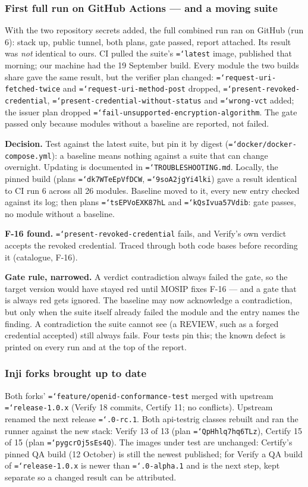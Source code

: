 \documentclass[11pt,a4paper]{article}
\let\origtexttt\texttt
\renewcommand{\texttt}[1]{\origtexttt{\hyphenchar\font=`\-\relax #1}}
\renewcommand{\_}{\textunderscore\allowbreak}
\begin{document}
\subsubsection*{First full run on GitHub Actions --- and a moving suite}
With the two repository secrets added, the full combined run ran on GitHub (run 6): stack up,
public tunnel, both plans, gate passed, report attached. Its result was \emph{not} identical to
ours. CI pulled the suite's \texttt{latest} image, published that morning; our machine had the
19 September build. Every module the two builds share gave the same result, but the verifier
plan changed: \texttt{request-uri-fetched-twice} and \texttt{request-uri-method-post} dropped,
\texttt{present-revoked-credential}, \texttt{present-credential-without-status} and
\texttt{wrong-vct} added; the issuer plan dropped \texttt{fail-unsupported-encryption-algorithm}.
The gate passed only because modules without a baseline are reported, not failed.

\textbf{Decision.} Test against the latest suite, but pin it by digest
(\texttt{docker/docker-compose.yml}): a baseline means nothing against a suite that can change
overnight. Updating is documented in \texttt{TROUBLESHOOTING.md}. Locally, the pinned build
(plans \texttt{dk7WTeEpVfDCW}, \texttt{9soA2jgYi4lki}) gave a result identical to CI run 6 across
all 26 modules. Baseline moved to it, every new entry checked against its log; then plans
\texttt{tsEPVoEXK87hL} and \texttt{kQsIvua57Vdib}: gate passes, no module without a baseline.

\textbf{F-16 found.} \texttt{present-revoked-credential} fails, and Verify's own verdict accepts
the revoked credential. Traced through both code bases before recording it (catalogue, F-16).

\textbf{Gate rule, narrowed.} A verdict contradiction always failed the gate, so the target
version would have stayed red until MOSIP fixes F-16 --- and a gate that is always red gets
ignored. The baseline may now acknowledge a contradiction, but only when the suite itself
already failed the module and the entry names the finding. A contradiction the suite cannot see
(a REVIEW, such as a forged credential accepted) still always fails. Four tests pin this; the
known defect is printed on every run and at the top of the report.

\subsubsection*{Inji forks brought up to date}
Both forks' \texttt{feature/openid-conformance-test} merged with upstream \texttt{release-1.0.x}
(Verify 18 commits, Certify 11; no conflicts). Upstream renamed the next release
\texttt{1.0.0-rc.1}. Both api-testrig classes rebuilt and ran the runner against the new stack:
Verify 13 of 13 (plan \texttt{QpHhlq7hq6TLz}), Certify 15 of 15 (plan \texttt{pygcrOj5sEs4Q}).
The images under test are unchanged: Certify's pinned QA build (12 October) is still the newest
published; for Verify a QA build of \texttt{release-1.0.x} is newer than
\texttt{1.0.0-alpha.1} and is the next step, kept separate so a changed result can be attributed.
\end{document}
